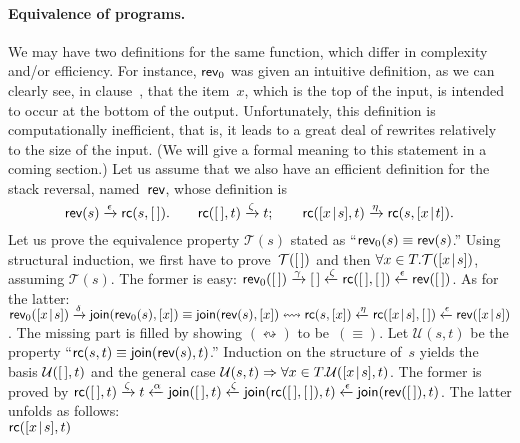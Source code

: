 \medskip

\paragraph{Equivalence of programs.}

We may have two definitions for the same function, which differ in
complexity and/or efficiency. For instance, \(\textsf{rev}_0\) was given
an intuitive definition, as we can clearly see, in
clause~\clause{\delta}, that the item~\(x\), which is the top of the
input, is intended to occur at the bottom of the
output. Unfortunately, this definition is computationally inefficient,
that is, it leads to a great deal of rewrites relatively to the size
of the input. (We will give a formal meaning to this statement in a
coming section.) Let us assume that we also have an efficient
definition for the stack reversal, named~\(\textsf{rev}\), whose
definition is
\begin{equation*}
\textsf{rev}(s)            \xrightarrow{\smash{\epsilon}} \textsf{rc}(s,[\,]).\qquad
\textsf{rc}([\,],t)         \xrightarrow{\smash{\zeta}} t;\qquad
\textsf{rc}([{x}\!\mid\!{s}],t) \xrightarrow{\smash{\eta}} \textsf{rc}(s,[{x}\!\mid\!{t}]).
\end{equation*}
Let us prove the equivalence property \(\mathcal{T}(s)\) stated as
``\(\textsf{rev}_0(s) \equiv \textsf{rev}(s)\).'' Using structural
induction, we first have to prove~\(\mathcal{T}([\,])\) and then
\(\forall x \in T.\mathcal{T}([{x}\!\mid\!{s}])\), assuming
\(\mathcal{T}(s)\). The former is easy: \(\textsf{rev}_0([\,])
\xrightarrow{\smash{\gamma}} [\,] \xleftarrow{\smash{\zeta}}
\textsf{rc}([\,],[\,]) \xleftarrow{\smash{\epsilon}} \textsf{rev}([\,])\). As for
the latter: \(\textsf{rev}_0([{x}\!\mid\!{s}]) \xrightarrow{\smash{\delta}}
\textsf{join}(\textsf{rev}_0(s),[x]) \equiv \textsf{join}(\textsf{rev}(s),[x])
\leftrightsquigarrow \textsf{rc}(s,[x]) \xleftarrow{\smash{\eta}}
\textsf{rc}([{x}\!\mid\!{s}],[\,]) \xleftarrow{\smash{\epsilon}}
\textsf{rev}([{x}\!\mid\!{s}])\). The missing part is filled by showing
\((\leftrightsquigarrow)\) to be~\((\equiv)\). Let
\(\mathcal{U}(s,t)\) be the property ``\(\textsf{rc}(s,t) \equiv
\textsf{join}(\textsf{rev}(s),t)\).'' Induction on the structure of~\(s\)
yields the basis \(\mathcal{U}([\,],t)\) and the general case
\(\mathcal{U}(s,t) \Rightarrow \forall x \in
T.\mathcal{U}([{x}\!\mid\!{s}],t)\). The former is proved by
\(\textsf{rc}([\,],t) \xrightarrow{\smash{\zeta}} t
\xleftarrow{\smash{\alpha}} \textsf{join}([\,],t) \xleftarrow{\smash{\zeta}}
\textsf{join}(\textsf{rc}([\,],[\,]),t) \xleftarrow{\smash{\epsilon}}
\textsf{join}(\textsf{rev}([\,]),t)\). The latter unfolds as
follows:\\ \(\textsf{rc}([{x}\!\mid\!{s}],t)\)
